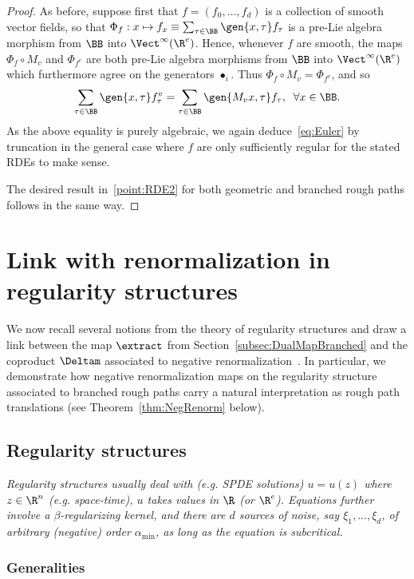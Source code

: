 \documentclass{article}
\begin{document}
\begin{proof}
As before, suppose first that $f = (f_0,\ldots, f_d)$ is a collection of smooth vector fields, so that $\Phi_f : x \mapsto f_x \equiv \sum_{\tau\in \BB} \gen{x,\tau}f_\tau$ is a pre-Lie algebra morphism from $\BB$ into $\Vect^\infty(\R^e)$. Hence, whenever $f$ are smooth, the maps $\Phi_f \circ M_v$ and $\Phi_{f^v}$ are both pre-Lie algebra morphisms from $\BB$ into $\Vect^\infty(\R^e)$ which furthermore agree on the generators $\bullet_i$. Thus $\Phi_f \circ M_v = \Phi_{f^v}$, and so
\[
\sum_{\tau \in \BB} \gen{x,\tau}f^v_\tau = \sum_{\tau \in \BB} \gen{M_v x,\tau}f_\tau, \; \; \forall x \in \BB.
\]
As the above equality is purely algebraic, we again deduce~\eqref{eq:Euler} by truncation in the general case where $f$ are only sufficiently regular for the stated RDEs to make sense.

The desired result in~\ref{point:RDE2} for both geometric and branched rough paths follows in the same way.
\end{proof}

\newpage

\section{Link with renormalization in regularity structures}
\label{sec:renorm}

We now recall several notions from the theory of regularity structures and draw a link between the map $\extract$ from Section~\ref{subsec:DualMapBranched} and the coproduct $\Deltam$  associated to negative renormalization~\cite{BHZ16, Hairer16}. In particular, we demonstrate how negative renormalization maps on the regularity structure associated to branched rough paths carry a natural interpretation as rough path translations (see Theorem~\ref{thm:NegRenorm} below).

\subsection{Regularity structures}

{\it Regularity structures usually deal with (e.g. SPDE solutions) $u=u(z)$ where $z \in \R^n$ (e.g. space-time), $u$ takes values in $\R$ (or $\R^e$). Equations further involve a $\beta$-regularizing kernel, and there are $d$ sources of noise, say $\xi_1,...,\xi_d$, of arbitrary (negative) order $\alpha_{\min}$, as long as the equation is subcritical.}

\subsubsection{Generalities}  
\end{document}

